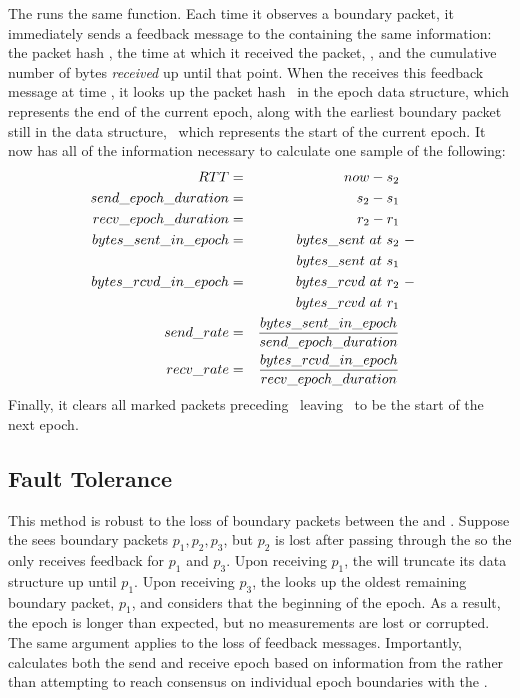The \outbox runs the same function. Each time it observes a boundary packet, 
it immediately sends a feedback message to the \inbox containing the same information:
the packet hash \hptwo, the time at which it received the packet, \rtwo, and the cumulative number of bytes
\emph{received} up until that point. When the \inbox receives this feedback message at time \atwo, it looks up the
packet hash \hptwo\ in the epoch data structure, which represents the end of the current epoch,
along with the earliest boundary packet still in the data structure, \hpone\ which represents the start
of the current epoch. It now has all of the information necessary to calculate one sample of the following:
\begin{subequations}
    \begin{align}
        RTT &= &now - s_2 \\
        send\_epoch\_duration &= &s_2 - s_1\\
        recv\_epoch\_duration &= &r_2 - r_1\\
        bytes\_sent\_in\_epoch &= &bytes\_sent\ at\ s_2 &\ - \\
                                    &&bytes\_sent\ at\ s_1&\notag\\
        bytes\_rcvd\_in\_epoch &= &bytes\_rcvd\ at\ r_2 &\ - \\
                                &&bytes\_rcvd\ at\ r_1\notag\\
        send\_rate &= &\frac{bytes\_sent\_in\_epoch}{send\_epoch\_duration}\\
        recv\_rate &= &\frac{bytes\_rcvd\_in\_epoch}{recv\_epoch\_duration}
    \end{align}
\end{subequations}
Finally, it clears all marked packets preceding \ptwo\ leaving \ptwo\
to be the start of the next epoch.

\subsection{Fault Tolerance}
\label{s:measure:loss}
 This method is robust to the loss of boundary packets between the \inbox and \outbox.
Suppose the \inbox sees boundary packets $p_1, p_2, p_3$, but $p_2$ is lost after passing through
the \inbox so the \inbox only receives feedback for $p_1$ and $p_3$. Upon receiving $p_1$, 
the \inbox will truncate its data structure up until $p_1$. Upon receiving $p_3$, the \inbox 
looks up the oldest remaining boundary packet, $p_1$, and considers that the beginning of the epoch.
As a result, the epoch is longer than expected, but no measurements are lost or corrupted. 
The same argument applies to the loss of feedback messages. 
Importantly, \inbox calculates both the send and receive epoch based on information
from the \outbox rather than attempting to reach consensus on individual epoch boundaries with the \outbox. 

